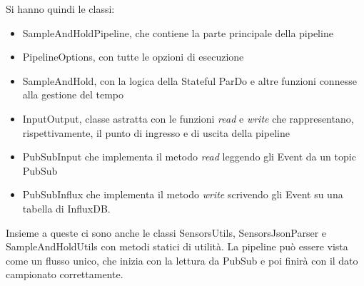 Si hanno quindi le classi:
\begin{itemize}
\item SampleAndHoldPipeline, che contiene la parte principale della pipeline
\item PipelineOptions, con tutte le opzioni di esecuzione
\item SampleAndHold, con la logica della Stateful ParDo e altre funzioni connesse alla gestione del tempo
\item InputOutput, classe astratta con le funzioni \textit{read} e \textit{write} che rappresentano, rispettivamente, il punto di ingresso e di uscita della pipeline
\item PubSubInput che implementa il metodo \textit{read} leggendo gli Event da un topic PubSub
\item PubSubInflux che implementa il metodo \textit{write} scrivendo gli Event su una tabella di InfluxDB.
\end{itemize}
Insieme a queste ci sono anche le classi SensorsUtils, SensorsJsonParser e SampleAndHoldUtils con metodi statici di utilità.
La pipeline può essere vista come un flusso unico, che inizia con la lettura da PubSub e poi finirà con il dato campionato correttamente. 
